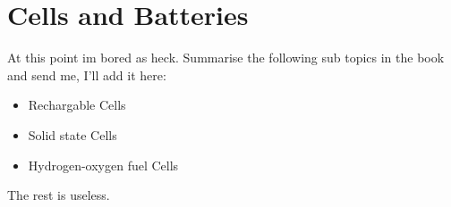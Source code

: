 \documentclass{scrbook}
\begin{document}
\section{Cells and Batteries}

	At this point im bored as heck. Summarise the following sub topics in the book and send me, I'll add it here:

	\begin{itemize}
		\item
			Rechargable Cells
		\item
			Solid state Cells
		\item
			Hydrogen-oxygen fuel Cells
	\end{itemize}

	The rest is useless.

\printbibliography{}
\end{document}
